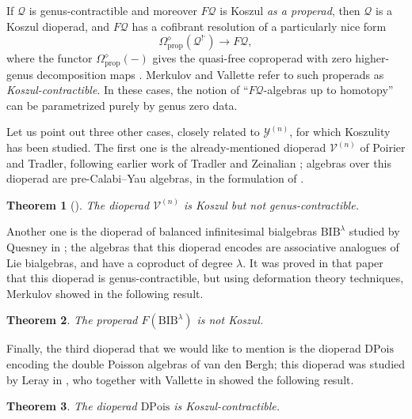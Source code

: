 \documentclass[11pt,a4paper]{amsart}
\newcommand{\scrY}{\mathscr{Y}}
\newcommand{\scrV}{\mathscr{V}}
\newcommand{\scrQ}{\mathscr{Q}}
\newcommand{\antish}{\ensuremath{\mbox{!`}}}
\newtheorem*{theorem*}{Theorem}
\theoremstyle{definition}
\begin{document}
If $\scrQ$ is genus-contractible and moreover $F\mathscr{Q}$ is Koszul \textit{as a properad}, then $\scrQ$ is a Koszul dioperad, and $F\mathscr{Q}$ has a cofibrant resolution of a particularly nice form
\[ \Omega^\diamond_\mathrm{prop}(\mathscr{Q}^{\antish}) \to F\mathscr{Q}, \]
where the functor $\Omega^\diamond_\mathrm{prop}(-)$ gives the quasi-free coproperad with zero higher-genus decomposition maps \cite[Propositions~48,49]{merkulov2009deformation}. Merkulov and Vallette refer to such properads as \emph{Koszul-contractible}. In these cases, the notion of ``$F\mathscr{Q}$-algebras up to homotopy'' can be parametrized purely by genus zero data. 

Let us point out three other cases, closely related to $\scrY^{(n)}$, for which Koszulity has been studied. The first one is the already-mentioned dioperad $\scrV^{(n)}$ of Poirier and Tradler, following earlier work of Tradler and Zeinalian \cite{tradler2007infinity}; algebras over this dioperad are pre-Calabi--Yau algebras, in the formulation of \cite{kontsevich2025pre}.
\begin{theorem*}[\cite{poirier2019koszuality,leray2025precalabiyau}]
    The dioperad $\scrV^{(n)}$ is Koszul but not genus-contractible.
\end{theorem*}

\noindent Another one is the dioperad of balanced infinitesimal bialgebras $\mathrm{BIB}^\lambda$ studied by Quesney in \cite{quesney2024balanced}; the algebras that this dioperad encodes are associative analogues of Lie bialgebras, and have a coproduct of degree $\lambda$. It was proved in that paper that this dioperad is genus-contractible, but using deformation theory techniques, Merkulov showed in \cite{merkulov2025complex} the following result.
\begin{theorem*}
    The properad $F(\mathrm{BIB}^\lambda)$ is not Koszul.
\end{theorem*}

\noindent Finally, the third dioperad that we would like to mention is the dioperad $\mathrm{DPois}$ encoding the double Poisson algebras of van den Bergh; this dioperad was studied by Leray in \cite{leray2019protoperadsI,leray2020protoperadsII}, who together with Vallette in \cite{leray2025precalabiyau} showed the following result.
\begin{theorem*}
    The dioperad $\mathrm{DPois}$ is Koszul-contractible.
\end{theorem*}
\end{document}
